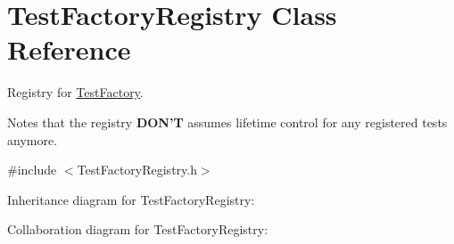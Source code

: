 \hypertarget{class_test_factory_registry}{\section{Test\+Factory\+Registry Class Reference}
\label{class_test_factory_registry}
}


Registry for \hyperlink{class_test_factory}{Test\+Factory}.

Notes that the registry {\bfseries D\+O\+N'T} assumes lifetime control for any registered tests anymore.  




{\ttfamily \#include $<$Test\+Factory\+Registry.\+h$>$}



Inheritance diagram for Test\+Factory\+Registry\+:


Collaboration diagram for Test\+Factory\+Registry\+:
